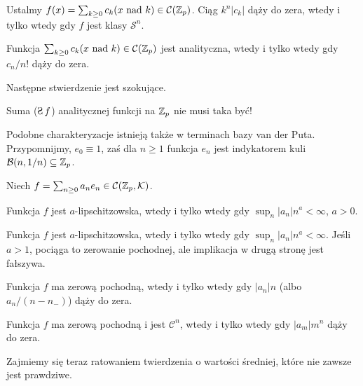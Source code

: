 \begin{fakt}
	Ustalmy $f(x) = \sum_{k\ge 0} c_k (x \mbox { nad } k) \in \mathcal C(\mathbb Z_p)$. 
	Ciąg $k^n |c_k|$ dąży do zera, wtedy i tylko wtedy gdy $f$ jest klasy $\mathcal S^n$.
\end{fakt}

\begin{fakt} %
	Funkcja  $\sum_{k\ge 0} c_k (x \mbox { nad } k) \in \mathcal C(\mathbb Z_p)$ jest analityczna, wtedy i tylko wtedy gdy $c_n / n!$ dąży do zera.
\end{fakt}

Następne stwierdzenie jest szokujące.

\begin{przyklad}
	Suma  ($\suma f$) analitycznej funkcji na $\mathbb Z_p$ nie musi taka być!
\end{przyklad}

Podobne charakteryzacje istnieją także w terminach bazy van der Puta.
Przypomnijmy, $e_0 \equiv 1$, zaś dla $n \ge 1$ funkcja $e_n$ jest indykatorem kuli $\mathcal B(n, 1/n) \subseteq \mathbb Z_p$.

Niech $f = \sum_{n \ge 0} a_n e_n \in \mathcal C(\mathbb Z_p, \mathcal K)$.

\begin{fakt}
	Funkcja  $f$ jest $a$-lipschitzowska, wtedy i tylko wtedy gdy $\sup_n |a_n| n^a < \infty$, $a > 0$.
\end{fakt}

\begin{fakt}
	Funkcja $f$ jest $a$-lipschitzowska, wtedy i tylko wtedy gdy $\sup_n |a_n| n^a < \infty$.
	Jeśli $a > 1$, pociąga to zerowanie pochodnej, ale implikacja w drugą stronę jest fałszywa.
\end{fakt}

\begin{fakt}
	Funkcja $f$ ma zerową pochodną, wtedy i tylko wtedy gdy $|a_n| n$ (albo $a_n / (n-n_-)$) dąży do zera.
\end{fakt}

\begin{fakt}
	Funkcja $f$ ma zerową pochodną i jest $\mathcal C^n$, wtedy i tylko wtedy gdy $|a_m|m^n$ dąży do zera.
\end{fakt}

Zajmiemy się teraz ratowaniem twierdzenia o wartości średniej, które nie zawsze jest prawdziwe.

